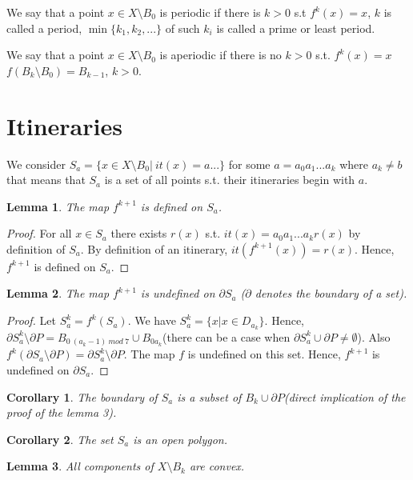 \documentclass[a4paper, 12pt]{article}
\newtheorem{lemma}{Lemma}
\newtheorem{cor}{Corollary}
\begin{document}
We say that a point $x\in X\setminus B_0$ is periodic if there is $k>0$ s.t $f^k(x)=x$, $k$ is called a period, $\min\{k_1,k_2,...\}$ of such $k_i$ is called a prime or least period.

We say that a point $x\in X\setminus B_0$ is aperiodic if there is no $k>0$ s.t. $f^k(x)=x$\newline
$f(B_k\setminus B_0)=B_{k-1}$, $k>0$.
\section{Itineraries}
We consider $S_a=\{x\in X\setminus B_0|\ it(x)=a...\}$ for some $a=a_0a_1...a_k$ where $a_k\neq b$ that means that $S_a$ is a set of all points s.t. their itineraries begin with $a$.\newline
\begin{lemma} The map $f^{k+1}$ is defined on $S_a$.
\end{lemma}
\begin{proof} For all $x \in S_a$ there exists $r(x)$ s.t. $it(x)=a_0a_1...a_kr(x)$ by definition of $S_a$. By definition of an itinerary, $it(f^{k+1}(x))=r(x)$. Hence, $f^{k+1}$ is defined on $S_a$.
\end{proof}
\begin{lemma} The map $f^{k+1}$ is undefined on $\partial S_a$ ($\partial$ denotes the boundary of a set).
\end{lemma}
\begin{proof}  Let $S_a^k=f^k(S_a)$. We have $S_a^k=\{x| x\in D_{a_k}\}$. Hence, $\partial S_a^k\setminus \partial P= B_{0\ (a_k-1)\ mod\ 7}\cup B_{0a_k}$(there can be a case when $\partial S_a^k\cup \partial P\neq \emptyset$). Also $f^k(\partial S_a\setminus \partial P)=\partial S_a^k\setminus \partial P$. The map $f$ is undefined on this set. Hence, $f^{k+1}$ is undefined on $\partial S_a$.
\end{proof}
\begin{cor} The boundary of $S_a$ is a subset of $B_k\cup \partial P$(direct implication of the proof of the lemma 3).
\end{cor}
\begin{cor} The set $S_a$ is an open polygon.
\end{cor}
\begin{lemma} All components of $X\setminus B_k$ are convex.
\end{lemma}
\end{document}
